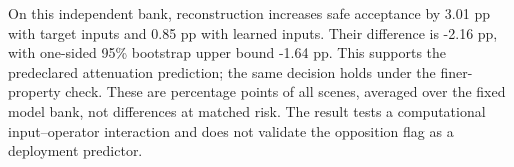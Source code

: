 On this independent bank, reconstruction increases safe acceptance by 3.01 pp with target inputs and 0.85 pp with learned inputs. Their difference is -2.16 pp, with one-sided 95\% bootstrap upper bound -1.64 pp. This supports the predeclared attenuation prediction; the same decision holds under the finer-property check. These are percentage points of all scenes, averaged over the fixed model bank, not differences at matched risk. The result tests a computational input--operator interaction and does not validate the opposition flag as a deployment predictor.
